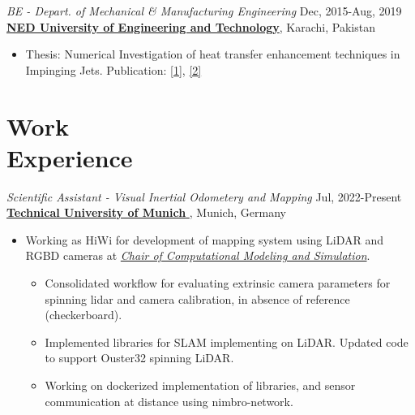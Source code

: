\documentclass[margin, 10pt]{res} %
\begin{document}
\begin{resume}
\begin{itemize}
\end{itemize} 

\emph{BE - Depart. of Mechanical \& Manufacturing Engineering } \hfill {\small Dec, 2015-Aug, 2019} \\
\href{https://www.neduet.edu.pk/}{\textbf{NED University of Engineering and Technology}}, Karachi, Pakistan
\begin{itemize}
\item Thesis: Numerical Investigation of heat transfer enhancement techniques in Impinging Jets. Publication: \href{https://doi.org/10.1002/htj.21986}{[1]}, \href{https://www.dl.begellhouse.com/references/4c8f5faa331b09ea,212bf76947bffc03,5aa059fb1b898ef8.html}{[2]}
\end{itemize} 




 
\section{Work\\ Experience \\}

\emph{Scientific Assistant - Visual Inertial Odometery and Mapping } \hfill {\small Jul, 2022-Present} \\
\href{https://www.tum.de/en/}{\textbf{Technical University of Munich} }, Munich, Germany
\begin{itemize}
\item Working as HiWi for development of mapping system using LiDAR and RGBD cameras at \href{https://www.cms.bgu.tum.de/de/}{\emph{ Chair of Computational Modeling and Simulation}}.
   \begin{itemize}
    \item Consolidated workflow for evaluating extrinsic camera parameters for spinning lidar and camera calibration, in absence of reference (checkerboard).
    \item Implemented libraries for SLAM implementing on LiDAR. Updated code to support Ouster32 spinning LiDAR. 
    \item Working on dockerized implementation of libraries, and sensor communication at distance using nimbro-network.
    

\end{itemize}
\end{itemize}
\end{resume}
\end{document}

